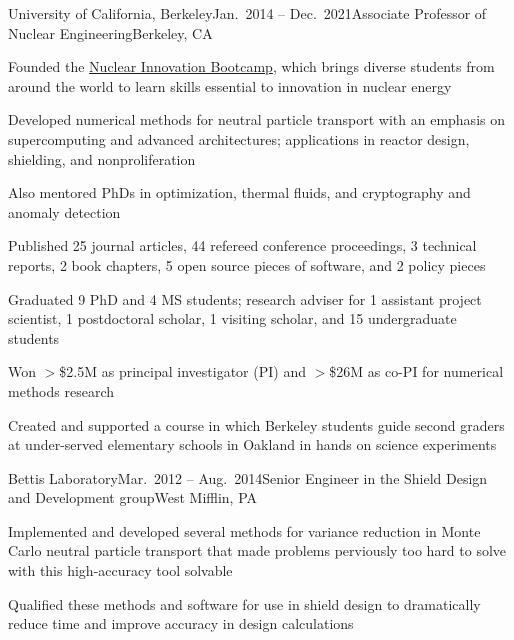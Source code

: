 \begin{rSubsection}{University of California, Berkeley}{Jan.\ 2014 -- Dec.\ 2021}{Associate Professor of Nuclear Engineering}{Berkeley, CA}
\item Founded the \href{https://www.nuclearinnovationbootcamp.org/}{Nuclear Innovation Bootcamp}, which brings diverse students from around the world to learn skills essential to innovation in nuclear energy 
\item Developed numerical methods for neutral particle transport with an emphasis on supercomputing and advanced architectures; applications in reactor design, shielding, and nonproliferation
\item Also mentored PhDs in optimization, thermal fluids, and cryptography and anomaly detection 
\item Published 25 journal articles, 44 refereed conference proceedings, 3 technical reports, 2 book chapters, 5 open source pieces of software, and 2 policy pieces
\item Graduated 9 PhD and 4 MS students; research adviser for 1 assistant project scientist, 1 postdoctoral scholar, 1 visiting scholar, and 15 undergraduate students
\item Won $>$\$2.5M as principal investigator (PI) and $>$\$26M as co-PI for numerical methods research
\item Created and supported a course in which Berkeley students guide second graders at under-served elementary schools in Oakland in hands on science experiments 
\end{rSubsection}


\clearpage
\begin{rSubsection}{Bettis Laboratory}{Mar.\ 2012 -- Aug.\ 2014}{Senior Engineer in the Shield Design and Development group}{West Mifflin, PA}
\item Implemented and developed several methods for variance reduction in Monte Carlo neutral particle transport that made problems perviously too hard to solve with this high-accuracy tool solvable
\item Qualified these methods and software for use in shield design to dramatically reduce time and improve accuracy in design calculations
\end{rSubsection}

